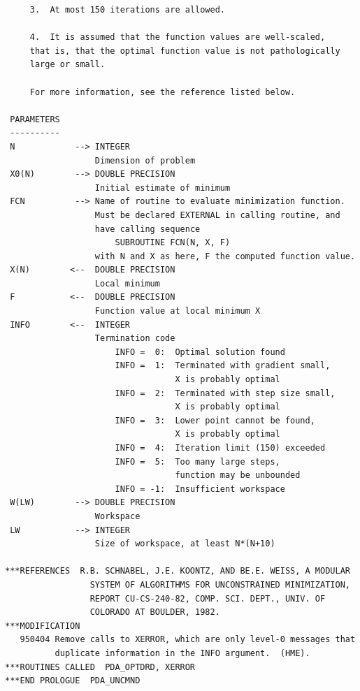 \documentclass[11pt,twoside]{article}
\begin{document}
\begin{verbatim}
     3.  At most 150 iterations are allowed.

     4.  It is assumed that the function values are well-scaled,
     that is, that the optimal function value is not pathologically
     large or small.

     For more information, see the reference listed below.

 PARAMETERS
 ----------
 N            --> INTEGER
                  Dimension of problem
 X0(N)        --> DOUBLE PRECISION
                  Initial estimate of minimum
 FCN          --> Name of routine to evaluate minimization function.
                  Must be declared EXTERNAL in calling routine, and
                  have calling sequence
                      SUBROUTINE FCN(N, X, F)
                  with N and X as here, F the computed function value.
 X(N)        <--  DOUBLE PRECISION
                  Local minimum
 F           <--  DOUBLE PRECISION
                  Function value at local minimum X
 INFO        <--  INTEGER
                  Termination code
                      INFO =  0:  Optimal solution found
                      INFO =  1:  Terminated with gradient small,
                                  X is probably optimal
                      INFO =  2:  Terminated with step size small,
                                  X is probably optimal
                      INFO =  3:  Lower point cannot be found,
                                  X is probably optimal
                      INFO =  4:  Iteration limit (150) exceeded
                      INFO =  5:  Too many large steps,
                                  function may be unbounded
                      INFO = -1:  Insufficient workspace
 W(LW)        --> DOUBLE PRECISION
                  Workspace
 LW           --> INTEGER
                  Size of workspace, at least N*(N+10)

***REFERENCES  R.B. SCHNABEL, J.E. KOONTZ, AND BE.E. WEISS, A MODULAR
                 SYSTEM OF ALGORITHMS FOR UNCONSTRAINED MINIMIZATION,
                 REPORT CU-CS-240-82, COMP. SCI. DEPT., UNIV. OF
                 COLORADO AT BOULDER, 1982.
***MODIFICATION
   950404 Remove calls to XERROR, which are only level-0 messages that
          duplicate information in the INFO argument.  (HME).
***ROUTINES CALLED  PDA_OPTDRD, XERROR
***END PROLOGUE  PDA_UNCMND
\end{verbatim}
\end{document}
